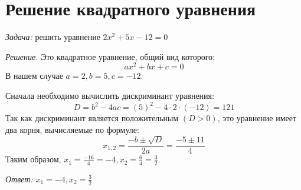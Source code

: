 \documentclass[a4paper,12pt]{article}
\begin{document}
\section{Решение квадратного уравнения}
\textit{Задача:} решить уравнение $2x^2 + 5x - 12 = 0$

\textit{Решение.} Это квадратное уравнение, общий вид которого:
 \[ ax^2 + bx + c = 0 \]
В нашем случае $a = 2, b = 5, c = -12.$

Сначала необходимо вычислить дискриминант уравнения:
  \[ D = b^2 - 4ac = (5)^2 - 4\cdot2\cdot(-12) = 121 \]
Так как дискриминант является положительным $(D > 0)$, это уравнение имеет два корня, вычисляемые по формуле:
   \[ x_{1,2} = \frac{-b \pm \sqrt{D}}{2a} = \frac{-5 \pm 11}{4} \]
Таким образом, $x_1 = \frac{-16}{4} = -4, x_2 = \frac{6}{4} = \frac{3}{2}.$

\textit{Ответ:} $x_1 = -4, x_2 = \frac{3}{2}$
\end{document}
